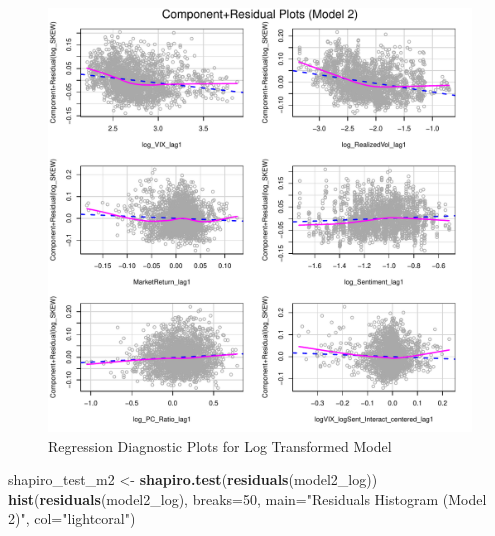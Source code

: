 \documentclass[
]{article}
\newenvironment{Shaded}{\begin{snugshade}}{\end{snugshade}}
\newcommand{\AttributeTok}[1]{\textcolor[rgb]{0.13,0.29,0.53}{#1}}
\newcommand{\DecValTok}[1]{\textcolor[rgb]{0.00,0.00,0.81}{#1}}
\newcommand{\FunctionTok}[1]{\textcolor[rgb]{0.13,0.29,0.53}{\textbf{#1}}}
\newcommand{\NormalTok}[1]{#1}
\newcommand{\OtherTok}[1]{\textcolor[rgb]{0.56,0.35,0.01}{#1}}
\newcommand{\StringTok}[1]{\textcolor[rgb]{0.31,0.60,0.02}{#1}}
\begin{document}
\begin{figure}
\centering
\includegraphics{FinalProject_files/figure-latex/model2-diagnostics-2.pdf}
\caption{Regression Diagnostic Plots for Log Transformed Model}
\end{figure}

\begin{Shaded}
\begin{Highlighting}[]
\NormalTok{    shapiro\_test\_m2 }\OtherTok{\textless{}{-}} \FunctionTok{shapiro.test}\NormalTok{(}\FunctionTok{residuals}\NormalTok{(model2\_log))}
    \FunctionTok{hist}\NormalTok{(}\FunctionTok{residuals}\NormalTok{(model2\_log), }\AttributeTok{breaks=}\DecValTok{50}\NormalTok{, }\AttributeTok{main=}\StringTok{"Residuals Histogram (Model 2)"}\NormalTok{, }\AttributeTok{col=}\StringTok{"lightcoral"}\NormalTok{)}
\end{Highlighting}
\end{Shaded}
\end{document}
